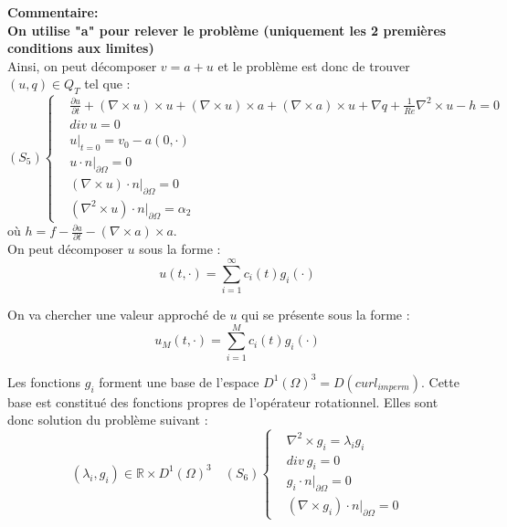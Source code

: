 \documentclass[a4paper,11pt]{article} %
\newcommand{\R}{{\mathbb{R}}}
\begin{document}
\textbf{Commentaire:\\
On utilise "a" pour relever le problème (uniquement les 2 premières conditions aux limites) }
\\

Ainsi, on peut décomposer $v=a+u$ et le problème est donc de trouver $(u,q)\in Q_T$ tel que :
\[
(S_5)\left\{
\begin{aligned}
&\frac{\partial u}{\partial t} + (\nabla\times u)\times u + (\nabla\times u)\times a +(\nabla\times a)\times u + \nabla q +\frac{1}{Re}\nabla^2\times u - h = 0\\
&div\ u = 0\\
&u\big\rvert_{t=0} = v_0 - a(0,\cdot)\\
&u\cdot n\big\rvert_{\partial\Omega} = 0\\
&(\nabla\times u)\cdot n\big\rvert_{\partial\Omega} = 0\\
&(\nabla^2\times u)\cdot n\big\rvert_{\partial\Omega} = \alpha_2
\end{aligned}
\right.
\]
où $h=f-\frac{\partial a}{\partial t} - (\nabla\times a)\times a$.\\

On peut décomposer $u$ sous la forme :
\[
u(t,\cdot) = \sum_{i=1}^{\infty} c_i(t)g_i(\cdot)
\]

On va chercher une valeur approché de $u$ qui se présente sous la forme :
\[
u_M(t,\cdot) = \sum_{i=1}^{M} c_i(t)g_i(\cdot)
\]

Les fonctions $g_i$ forment une base de l'espace $D^1(\Omega)^3 = D(curl_{imperm})$. Cette base est constitué des fonctions propres de l'opérateur rotationnel. Elles sont donc solution du problème suivant :
\[
(\lambda_i,g_i)\in\R\times D^1(\Omega)^3\quad (S_6)\left\{
\begin{aligned}
&\nabla^2\times g_i = \lambda_i g_i\\
&div\ g_i = 0\\
&g_i\cdot n\big\rvert_{\partial\Omega} = 0\\
&(\nabla\times g_i)\cdot n\big\rvert_{\partial\Omega} = 0
\end{aligned}
\right.
\]
\end{document}
